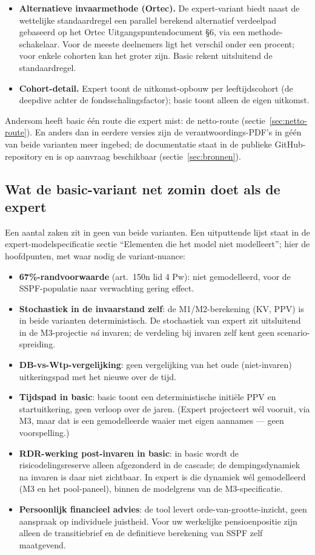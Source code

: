 \documentclass[11pt,a4paper]{article}
\begin{document}
\begin{itemize}
\item \textbf{Alternatieve invaarmethode (Ortec).} De expert-variant biedt naast de wettelijke standaardregel een parallel berekend alternatief verdeelpad gebaseerd op het Ortec Uitgangspuntendocument \S6, via een methode-schakelaar. Voor de meeste deelnemers ligt het verschil onder een procent; voor enkele cohorten kan het groter zijn. Basic rekent uitsluitend de standaardregel.

\item \textbf{Cohort-detail.} Expert toont de uitkomst-opbouw per leeftijdscohort (de deepdive achter de fondsschalingsfactor); basic toont alleen de eigen uitkomst.

\end{itemize}

Andersom heeft basic één route die expert mist: de netto-route (sectie~\ref{sec:netto-route}). En anders dan in eerdere versies zijn de verantwoordings-PDF's in géén van beide varianten meer ingebed; de documentatie staat in de publieke GitHub-repository en is op aanvraag beschikbaar (sectie~\ref{sec:bronnen}).

\subsection{Wat de basic-variant net zomin doet als de expert}

Een aantal zaken zit in geen van beide varianten. Een uitputtende lijst staat in de expert-modelspecificatie sectie ``Elementen die het model niet modelleert''; hier de hoofdpunten, met waar nodig de variant-nuance:

\begin{itemize}
\item \textbf{67\%-randvoorwaarde} (art.\ 150n lid 4 Pw): niet gemodelleerd, voor de SSPF-populatie naar verwachting gering effect.
\item \textbf{Stochastiek in de invaarstand zelf}: de M1/M2-berekening (KV, PPV) is in beide varianten deterministisch. De stochastiek van expert zit uitsluitend in de M3-projectie \emph{ná} invaren; de verdeling bij invaren zelf kent geen scenario-spreiding.
\item \textbf{DB-vs-Wtp-vergelijking}: geen vergelijking van het oude (niet-invaren) uitkeringspad met het nieuwe over de tijd.
\item \textbf{Tijdspad in basic}: basic toont een deterministische initiële PPV en startuitkering, geen verloop over de jaren. (Expert projecteert wél vooruit, via M3, maar dat is een gemodelleerde waaier met eigen aannames --- geen voorspelling.)
\item \textbf{RDR-werking post-invaren in basic}: in basic wordt de risicodelingsreserve alleen afgezonderd in de cascade; de dempingsdynamiek na invaren is daar niet zichtbaar. In expert is die dynamiek wél gemodelleerd (M3 en het pool-paneel), binnen de modelgrens van de M3-specificatie.
\item \textbf{Persoonlijk financieel advies}: de tool levert orde-van-grootte-inzicht, geen aanspraak op individuele juistheid. Voor uw werkelijke pensioenpositie zijn alleen de transitiebrief en de definitieve berekening van SSPF zelf maatgevend.
\end{itemize}
\end{document}
